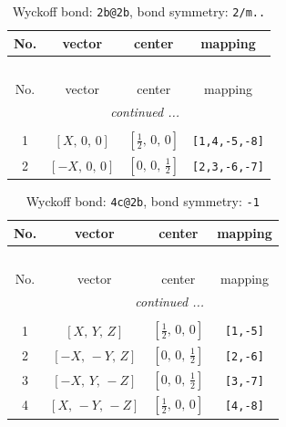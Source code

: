 \documentclass[fleqn,8pt]{jsarticle}
\begin{document}
\renewcommand{\arraystretch}{1.2}
\begin{longtable}{cccc}
\caption{Wyckoff bond: {\tt 2b@2b}, bond symmetry: {\tt 2/m..}}
 \\
 \hline \hline
No. & vector & center & mapping \\ \hline \endfirsthead

\multicolumn{3}{l}{\tablename\ \thetable{}} \\
 \hline \hline
No. & vector & center & mapping \\ \hline \endhead

 \hline \hline
\multicolumn{3}{r}{\footnotesize\it continued ...} \\ \endfoot

 \hline \hline
\multicolumn{3}{r}{} \\ \endlastfoot

1 & $\left[ X,\, 0,\, 0 \right]$ & $\left[ \frac{1}{2},\, 0,\, 0 \right]$ & {\tt [1,4,-5,-8]} \\ \hline
2 & $\left[ - X,\, 0,\, 0 \right]$ & $\left[ 0,\, 0,\, \frac{1}{2} \right]$ & {\tt [2,3,-6,-7]} \\
\end{longtable}
\renewcommand{\arraystretch}{1.2}
\begin{longtable}{cccc}
\caption{Wyckoff bond: {\tt 4c@2b}, bond symmetry: {\tt -1}}
 \\
 \hline \hline
No. & vector & center & mapping \\ \hline \endfirsthead

\multicolumn{3}{l}{\tablename\ \thetable{}} \\
 \hline \hline
No. & vector & center & mapping \\ \hline \endhead

 \hline \hline
\multicolumn{3}{r}{\footnotesize\it continued ...} \\ \endfoot

 \hline \hline
\multicolumn{3}{r}{} \\ \endlastfoot

1 & $\left[ X,\, Y,\, Z \right]$ & $\left[ \frac{1}{2},\, 0,\, 0 \right]$ & {\tt [1,-5]} \\ \hline
2 & $\left[ - X,\, - Y,\, Z \right]$ & $\left[ 0,\, 0,\, \frac{1}{2} \right]$ & {\tt [2,-6]} \\ \hline
3 & $\left[ - X,\, Y,\, - Z \right]$ & $\left[ 0,\, 0,\, \frac{1}{2} \right]$ & {\tt [3,-7]} \\ \hline
4 & $\left[ X,\, - Y,\, - Z \right]$ & $\left[ \frac{1}{2},\, 0,\, 0 \right]$ & {\tt [4,-8]} \\
\end{longtable}
\end{document}
